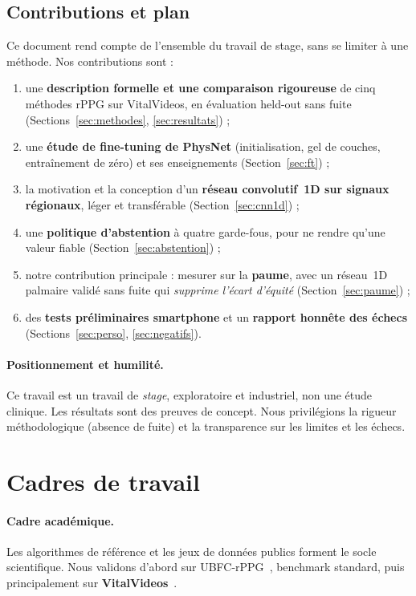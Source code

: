 \documentclass[11pt]{article}
\begin{document}
\subsection{Contributions et plan}
Ce document rend compte de l'ensemble du travail de stage, sans se limiter à une
méthode. Nos contributions sont :
\begin{enumerate}\itemsep2pt
  \item une \textbf{description formelle et une comparaison rigoureuse} de cinq
  méthodes rPPG sur VitalVideos, en évaluation held-out sans fuite
  (Sections~\ref{sec:methodes}, \ref{sec:resultats}) ;
  \item une \textbf{étude de fine-tuning de PhysNet} (initialisation, gel de couches,
  entraînement de zéro) et ses enseignements (Section~\ref{sec:ft}) ;
  \item la motivation et la conception d'un \textbf{réseau convolutif~1D sur signaux
  régionaux}, léger et transférable (Section~\ref{sec:cnn1d}) ;
  \item une \textbf{politique d'abstention} à quatre garde-fous, pour ne rendre
  qu'une valeur fiable (Section~\ref{sec:abstention}) ;
  \item notre contribution principale : mesurer sur la \textbf{paume}, avec un
  réseau~1D palmaire validé sans fuite qui \emph{supprime l'écart d'équité}
  (Section~\ref{sec:paume}) ;
  \item des \textbf{tests préliminaires smartphone} et un \textbf{rapport honnête des
  échecs} (Sections~\ref{sec:perso}, \ref{sec:negatifs}).
\end{enumerate}

\paragraph{Positionnement et humilité.} Ce travail est un travail de \emph{stage},
exploratoire et industriel, non une étude clinique. Les résultats sont des preuves de
concept. Nous privilégions la rigueur méthodologique (absence de fuite) et la
transparence sur les limites et les échecs.

\section{Cadres de travail}
\label{sec:cadres}

\paragraph{Cadre académique.} Les algorithmes de référence et les jeux de données
publics forment le socle scientifique. Nous validons d'abord sur
UBFC-rPPG~\cite{bobbia2019}, benchmark standard, puis principalement sur
\textbf{VitalVideos}~\cite{toye2023}.
\end{document}
